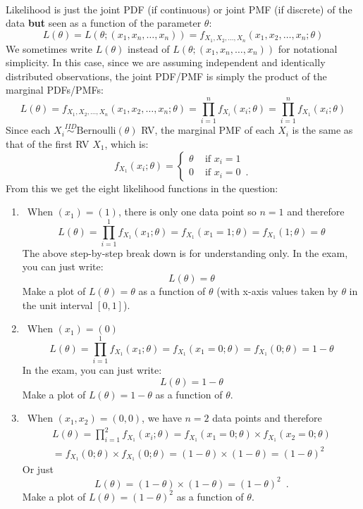 \begin{Answer}
~\\
Likelihood is just the joint PDF (if continuous) or joint PMF (if discrete) of the data {\bf but} seen as a function of the parameter $\theta$: 
\[
L(\theta)=L(\theta; (x_1,x_n,\ldots,x_n)) = f_{X_1,X_2,\ldots,X_n}(x_1,x_2,\ldots,x_n; \theta)
\]
We sometimes write $L(\theta)$ instead of $L(\theta; (x_1,x_n,\ldots,x_n))$ for notational simplicity.  
In this case, since we are assuming independent and identically distributed observations, the joint PDF/PMF is simply the product of the marginal PDFs/PMFs:
\[
L(\theta) = f_{X_1,X_2,\ldots,X_n}(x_1,x_2,\ldots,x_n; \theta) = \prod_{i=1}^n f_{X_i}(x_i;\theta) = \prod_{i=1}^n f_{X_1}(x_i;\theta)
\]
Since each $X_i \overset{IID}{\sim} \mathrm{Bernoulli}(\theta)$ RV, the marginal PMF of each $X_i$ is the same as that of the first RV $X_1$, which is:
\[
f_{X_1}(x_i; \theta) 
= 
\begin{cases}
\theta & \text{ if } x_i = 1\\
0 & \text{ if } x_i=0 \enspace.
\end{cases}
\]
From this we get the eight likelihood functions in the question:
\begin{enumerate}
\item~When $(x_1)=(1)$, there is only one data point so $n=1$ and therefore
$$L(\theta)= \prod_{i=1}^1 f_{X_1}(x_1;\theta) = f_{X_1}(x_1=1;\theta) = f_{X_1}(1;\theta)=\theta$$
The above step-by-step break down is for understanding only.  In the exam, you can just write:
$$L(\theta)= \theta$$
Make a plot of $L(\theta)=\theta$ as a function of $\theta$ (with x-axis values taken by $\theta$ in the unit interval $[0,1]$).
\item~When $(x_1)=(0)$
$$L(\theta)= \prod_{i=1}^1 f_{X_1}(x_1;\theta) = f_{X_1}(x_1=0;\theta) = f_{X_1}(0;\theta)=1-\theta$$
In the exam, you can just write:
$$L(\theta)= 1-\theta$$
Make a plot of $L(\theta)=1-\theta$ as a function of $\theta$.
\item~When $(x_1,x_2)=(0,0)$, we have $n=2$ data points and therefore
\begin{multline*}
L(\theta)= \prod_{i=1}^2 f_{X_1}(x_i;\theta) = f_{X_1}(x_1=0;\theta) \times f_{X_1}(x_2=0;\theta) \\
= f_{X_1}(0;\theta)\times f_{X_1}(0;\theta) =(1-\theta) \times (1-\theta) = (1-\theta)^2
\end{multline*}
Or just
\[
L(\theta) = (1-\theta) \times (1-\theta) = (1-\theta)^2 \enspace .
\]
Make a plot of $L(\theta)=(1-\theta)^2$ as a function of $\theta$.

\end{enumerate}
\end{Answer}
